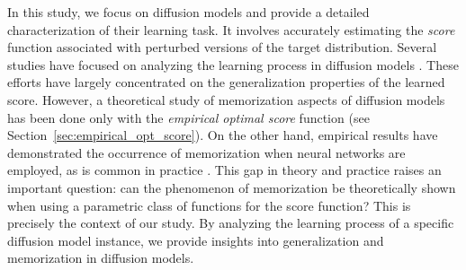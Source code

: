 

In this study, we focus on diffusion models and provide a detailed characterization of their learning task. It involves accurately estimating the \textit{score} function associated with perturbed versions of the target distribution. 
Several studies have focused on analyzing the learning process in diffusion models \cite{chen_score_2023, oko_diffusion_2023, cui_analysis_2023,cui_precise_2025, shah_learning_2023}. These efforts have largely concentrated on the generalization properties of the learned score. However, a theoretical study of memorization aspects of diffusion models has been done only with the \textit{empirical optimal score} function \cite{biroli_dynamical_2024, achilli_losing_2024} (see Section~\ref{sec:empirical_opt_score}). On the other hand, empirical results have demonstrated the occurrence of memorization when neural networks are employed, as is common in practice \cite{somepalli_diffusion_2023,somepalli_understanding_2024,carlini_extracting_2023,zhang_emergence_2024,yoon_diffusion_2023,gu_memorization_2023,ross_geometric_2024}. This gap in theory and practice raises an important question: can the phenomenon of memorization be theoretically shown when using a parametric class of functions for the score function? This is precisely the context of our study. By analyzing the learning process of a specific diffusion model instance, we provide insights into generalization and memorization in diffusion models. 

